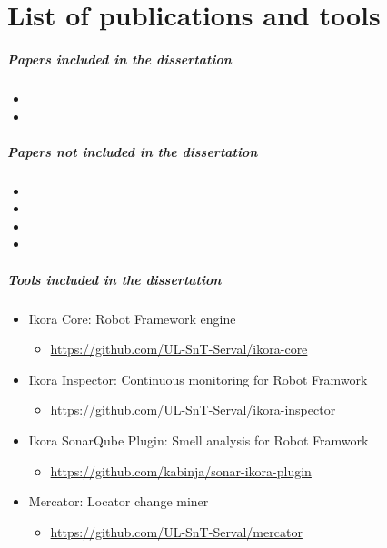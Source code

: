 \chapter*{List of publications and tools}

\paragraph{Papers included in the dissertation}

\begin{itemize}
	\item {}
	\item {}
\end{itemize}

\paragraph{Papers not included in the dissertation}

\begin{itemize}
    \item {}
	\item {}
	\item {}
	\item {}
\end{itemize}

\paragraph{Tools included in the dissertation}

\begin{itemize}
	\item Ikora Core: Robot Framework engine
	\begin{itemize}
		\item \url{https://github.com/UL-SnT-Serval/ikora-core}
	\end{itemize}
	
	\item Ikora Inspector: Continuous monitoring for Robot Framwork
	\begin{itemize}
		\item \url{https://github.com/UL-SnT-Serval/ikora-inspector}
	\end{itemize}
	
	\item Ikora SonarQube Plugin: Smell analysis for Robot Framwork
	\begin{itemize}
		\item \url{https://github.com/kabinja/sonar-ikora-plugin}
	\end{itemize}
	
	\item Mercator: Locator change miner
	\begin{itemize}
		\item \url{https://github.com/UL-SnT-Serval/mercator}
	\end{itemize}
\end{itemize}